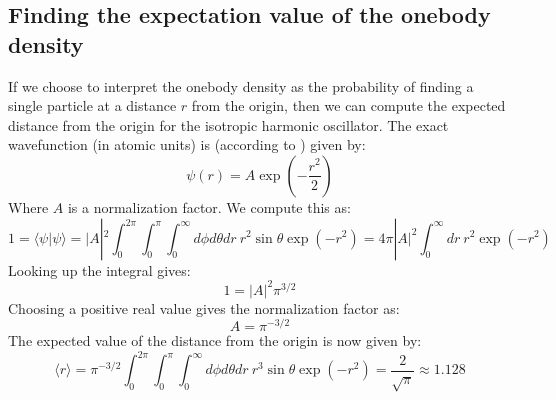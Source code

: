 \documentclass[a4paper, 10pt]{article}
\begin{document}
\begin{appendices}
		\section{Finding the expectation value of the onebody density}\label{ap:Expectation_value_onebody}
		If we choose to interpret the onebody density as the probability of finding a single particle at a distance $r$ from the origin, then we can compute the expected distance from the origin for the isotropic harmonic oscillator. The exact wavefunction (in atomic units) is (according to \cite{Griffiths2004}) given by:
		\begin{equation}
		\psi(r)=A\exp\left(-\frac{r^2}{2}\right)
		\end{equation}
		Where $A$ is a normalization factor. We compute this as:
		\begin{equation}
		1=\langle \psi | \psi \rangle = |A|^2 \int_0^{2\pi}\int_0^{\pi} \int_0^{\infty} d\phi d\theta dr\ r^2 \sin \theta \exp \left(-r^2\right) = 4\pi |A|^2\int_0^{\infty}dr\ r^2\exp(-r^2)
		\end{equation}
		Looking up the integral gives:
		\begin{equation}
		1= |A|^2 \pi^{3/2}
		\end{equation}
		Choosing a positive real value gives the normalization factor as:
		\begin{equation}
		A=\pi^{-3/2}
		\end{equation}
		The expected value of the distance from the origin is now given by:
		\begin{equation}
		\langle r \rangle =\pi^{-3/2}\int_0^{2\pi}\int_0^{\pi} \int_0^{\infty}d\phi d\theta dr\ r^3\sin \theta \exp (-r^2)=\frac{2}{\sqrt{\pi}}\approx 1.128
		\end{equation}

\end{appendices}
\end{document}
